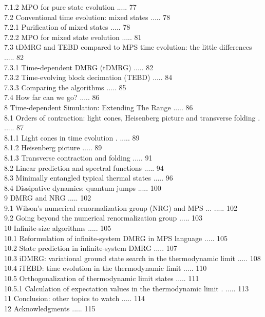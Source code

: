 \documentclass[12pt]{article}
\begin{document}
7.1.2 MPO for pure state evolution ..... 77\\
7.2 Conventional time evolution: mixed states ..... 78\\
7.2.1 Purification of mixed states ..... 78\\
7.2.2 MPO for mixed state evolution ..... 81\\
7.3 tDMRG and TEBD compared to MPS time evolution: the little differences ..... 82\\
7.3.1 Time-dependent DMRG (tDMRG) ..... 82\\
7.3.2 Time-evolving block decimation (TEBD) ..... 84\\
7.3.3 Comparing the algorithms ..... 85\\
7.4 How far can we go? ..... 86\\
8 Time-dependent Simulation: Extending The Range ..... 86\\
8.1 Orders of contraction: light cones, Heisenberg picture and transverse folding . ..... 87\\
8.1.1 Light cones in time evolution . ..... 89\\
8.1.2 Heisenberg picture ..... 89\\
8.1.3 Transverse contraction and folding ..... 91\\
8.2 Linear prediction and spectral functions ..... 94\\
8.3 Minimally entangled typical thermal states ..... 96\\
8.4 Dissipative dynamics: quantum jumps ..... 100\\
9 DMRG and NRG ..... 102\\
9.1 Wilson's numerical renormalization group (NRG) and MPS ... ..... 102\\
9.2 Going beyond the numerical renormalization group ..... 103\\
10 Infinite-size algorithms ..... 105\\
10.1 Reformulation of infinite-system DMRG in MPS language ..... 105\\
10.2 State prediction in infinite-system DMRG ..... 107\\
10.3 iDMRG: variational ground state search in the thermodynamic limit ..... 108\\
10.4 iTEBD: time evolution in the thermodynamic limit ..... 110\\
10.5 Orthogonalization of thermodynamic limit states ..... 111\\
10.5.1 Calculation of expectation values in the thermodynamic limit . ..... 113\\
11 Conclusion: other topics to watch ..... 114\\
12 Acknowledgments ..... 115
\end{document}
